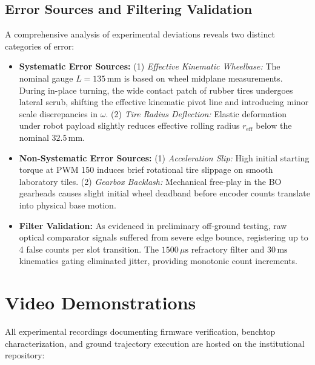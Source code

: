\documentclass[11pt,a4paper]{article}
\begin{document}
\subsection{Error Sources and Filtering Validation}
A comprehensive analysis of experimental deviations reveals two distinct categories of error:
\begin{itemize}[leftmargin=*,noitemsep,topsep=1pt]
    \item \textbf{Systematic Error Sources:} (1) \emph{Effective Kinematic Wheelbase:} The nominal gauge $L = 135\,\text{mm}$ is based on wheel midplane measurements. During in-place turning, the wide contact patch of rubber tires undergoes lateral scrub, shifting the effective kinematic pivot line and introducing minor scale discrepancies in $\omega$. (2) \emph{Tire Radius Deflection:} Elastic deformation under robot payload slightly reduces effective rolling radius $r_{\text{eff}}$ below the nominal $32.5\,\text{mm}$.
    \item \textbf{Non-Systematic Error Sources:} (1) \emph{Acceleration Slip:} High initial starting torque at PWM 150 induces brief rotational tire slippage on smooth laboratory tiles. (2) \emph{Gearbox Backlash:} Mechanical free-play in the BO gearheads causes slight initial wheel deadband before encoder counts translate into physical base motion.
    \item \textbf{Filter Validation:} As evidenced in preliminary off-ground testing, raw optical comparator signals suffered from severe edge bounce, registering up to 4 false counts per slot transition. The $1500\,\mu\text{s}$ refractory filter and $30\,\text{ms}$ kinematics gating eliminated jitter, providing monotonic count increments.
\end{itemize}

\section{Video Demonstrations}
All experimental recordings documenting firmware verification, benchtop characterization, and ground trajectory execution are hosted on the institutional repository:
\end{document}
